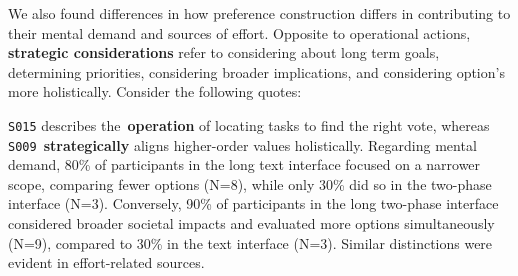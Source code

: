 We also found differences in how preference construction differs in contributing to their mental demand and sources of effort. Opposite to operational actions, \textbf{strategic considerations} refer to considering about long term goals, determining priorities, considering broader implications, and considering option's more holistically. Consider the following quotes:




\texttt{S015} describes the~\textbf{operation} of locating tasks to find the right vote, whereas \texttt{S009}~\textbf{strategically} aligns higher-order values holistically. Regarding mental demand, 80\% of participants in the long text interface focused on a narrower scope, comparing fewer options (N=8), while only 30\% did so in the two-phase interface (N=3). Conversely, 90\% of participants in the long two-phase interface considered broader societal impacts and evaluated more options simultaneously (N=9), compared to 30\% in the text interface (N=3). Similar distinctions were evident in effort-related sources.

